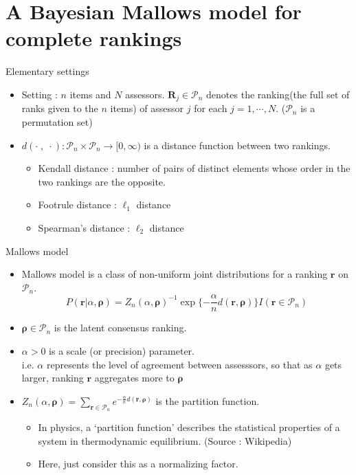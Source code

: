 \documentclass[11pt]{beamer}
\begin{document}
\section{A Bayesian Mallows model for complete rankings}
\begin{frame}{Elementary settings}
\begin{itemize}
    \item Setting : $n$ items and $N$ assessors. $\mathbf{R}_j\in \mathcal{P}_n$ denotes the ranking(the full set of ranks given to the $n$ items) of assessor $j$ for each $j=1,\cdots, N$. ($\mathcal{P}_n$ is a permutation set)
    \item $d(\cdot\;,\; \cdot): \mathcal{P}_n\times \mathcal{P}_n\rightarrow [0,\infty)$ is a distance function between two rankings.
    \begin{itemize}
        \item Kendall distance : number of pairs of distinct elements whose order in the two rankings are the opposite.
        \item Footrule distance : $\ell_1$ distance
        \item Spearman's distance : $\ell_2$ distance 
    \end{itemize}
\end{itemize} 
\end{frame}

\begin{frame}{Mallows model}
\begin{itemize}
    \item Mallows model is a class of non-uniform joint distributions for a ranking $\mathbf{r}$ on $\mathcal{P}_n$. $$P(\mathbf{r}|\alpha, \boldsymbol{\rho})=Z_n(\alpha, \boldsymbol{\rho})^{-1}\exp\{-\frac{\alpha}{n}d(\mathbf{r}, \boldsymbol{\rho})\}I(\mathbf{r}\in \mathcal{P}_n) $$
    \item $\boldsymbol{\rho}\in \mathcal{P}_n$ is the latent consensus ranking. 
    \item $\alpha>0$ is a scale (or precision) parameter. \\i.e. $\alpha$ represents the level of agreement between assesssors, so that as $\alpha$ gets larger, ranking $\mathbf{r}$ aggregates more to $\boldsymbol{\rho}$ 
    \item $Z_n(\alpha, \boldsymbol{\rho})=\sum_{\mathbf{r}\in \mathcal{P}_n}e^{-\frac{\alpha}{n}d(\mathbf{r},\boldsymbol{\rho})}$ is the partition function.
    \begin{itemize}
        \item In physics, a `partition function' describes the statistical properties of a system in thermodynamic equilibrium. (Source : Wikipedia)
        \item Here, just consider this as a normalizing factor.
    \end{itemize}
\end{itemize} 
\end{frame}
\end{document}
